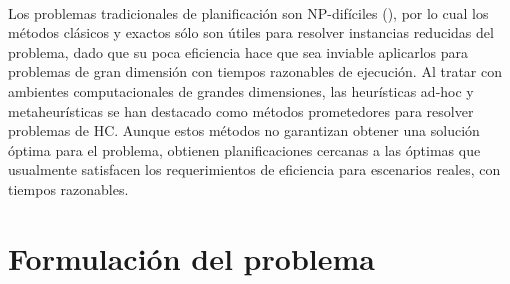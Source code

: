 \paragraph{}Los problemas tradicionales de planificación son NP-difíciles (\citet{bib-garey}), por lo cual los métodos clásicos y exactos sólo son útiles para resolver instancias reducidas del problema, dado que su poca eficiencia hace que sea inviable aplicarlos para problemas de gran dimensión con tiempos razonables de ejecución.
Al tratar con ambientes computacionales de grandes dimensiones, las heurísticas ad-hoc y metaheurísticas se han destacado como métodos prometedores para resolver problemas de HC.
Aunque estos métodos no garantizan obtener una solución óptima para el problema, obtienen planificaciones cercanas a las óptimas que usualmente satisfacen los requerimientos de eficiencia para escenarios reales, con tiempos razonables.

\section{Formulación del problema} \label{section:descripcion-problema,subsection:formulacion-problema}


